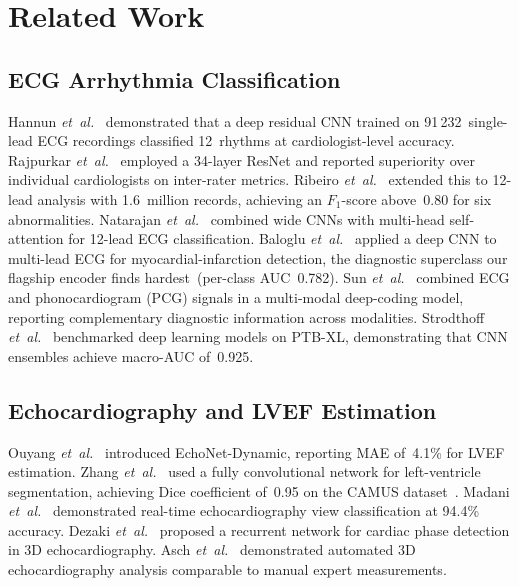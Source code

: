 \documentclass[AMA,STIX1COL,]{WileyNJD-v2}
\begin{document}
\section{Related Work}
\label{sec:related}

\subsection{ECG Arrhythmia Classification}

Hannun \emph{et~al.}~\cite{hannun2019} demonstrated that a deep
residual CNN trained on 91\,232~single-lead ECG recordings classified
12~rhythms at cardiologist-level accuracy. Rajpurkar
\emph{et~al.}~\cite{rajpurkar2017} employed a 34-layer ResNet and
reported superiority over individual cardiologists on inter-rater
metrics. Ribeiro \emph{et~al.}~\cite{ribeiro2020} extended this to
12-lead analysis with 1.6~million records, achieving an $F_1$-score
above~0.80 for six abnormalities. Natarajan
\emph{et~al.}~\cite{natarajan2020} combined wide CNNs with multi-head
self-attention for 12-lead ECG classification. Baloglu
\emph{et~al.}~\cite{baloglu2019} applied a deep CNN to multi-lead ECG
for myocardial-infarction detection, the diagnostic superclass our
flagship encoder finds hardest~(per-class AUC~0.782). Sun
\emph{et~al.}~\cite{sun2024} combined ECG and phonocardiogram
(PCG) signals in a multi-modal deep-coding model, reporting
complementary diagnostic information across modalities. Strodthoff
\emph{et~al.}~\cite{strodthoff2021} benchmarked deep learning models
on PTB-XL, demonstrating that CNN ensembles achieve macro-AUC of~0.925.

\subsection{Echocardiography and LVEF Estimation}

Ouyang \emph{et~al.}~\cite{ouyang2020} introduced EchoNet-Dynamic,
reporting MAE of~4.1\% for LVEF estimation. Zhang
\emph{et~al.}~\cite{zhang2018} used a fully convolutional network for
left-ventricle segmentation, achieving Dice coefficient of~0.95 on the
CAMUS dataset~\cite{leclerc2019}. Madani \emph{et~al.}~\cite{madani2018} demonstrated
real-time echocardiography view classification at 94.4\% accuracy.
Dezaki \emph{et~al.}~\cite{dezaki2019} proposed a recurrent network
for cardiac phase detection in 3D echocardiography. Asch
\emph{et~al.}~\cite{asch2019} demonstrated automated 3D
echocardiography analysis comparable to manual expert measurements.
\end{document}
